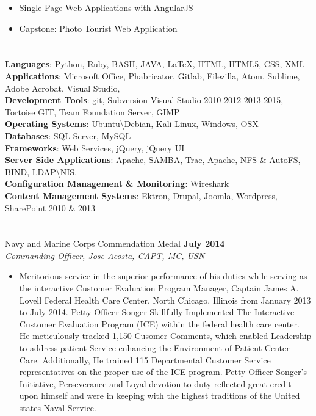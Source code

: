 \documentclass[a4papper,overlapped,line]{res}
\newcommand{\osection}[1]{\section{\sc {\color{MidnightBlue}\vspace{-0.60cm} \textbf{#1}\\}}}
\begin{document}
\begin{resume}
\begin{itemize}
	\item Single Page Web Applications with AngularJS
	\item Capstone: Photo Tourist Web Application
\end{itemize}
\osection{TECHNOLOGY}
\textbf{Languages}:  Python, Ruby, BASH, JAVA, \LaTeX, HTML, HTML5, CSS, XML \\
\textbf{Applications}: Microsoft Office, Phabricator, Gitlab, Filezilla, Atom, Sublime, Adobe Acrobat, Visual Studio,    \\
\textbf{Development Tools}: git, Subversion Visual Studio 2010 2012 2013 2015, Tortoise GIT, Team Foundation Server, GIMP  \\
\textbf{Operating Systems}:   Ubuntu\textbackslash Debian, Kali Linux, Windows, OSX\\
\textbf{Databases}: SQL Server, MySQL \\
\textbf{Frameworks}: Web Services, jQuery, jQuery UI   \\
\textbf{Server Side Applications}: Apache, SAMBA,  Trac, Apache, NFS \& AutoFS,  BIND, LDAP\textbackslash NIS.\\
\textbf{Configuration Management \& Monitoring}: Wireshark\\
\textbf{Content Management Systems}: Ektron, Drupal, Joomla, Wordpress, SharePoint  2010 \& 2013\\
\linebreak
\osection{HONORS AND AWARDS}
Navy and Marine Corps Commendation Medal \hfill \textbf{July 2014} \\
\textit{Commanding Officer, Jose Acosta, CAPT, MC, USN}
\begin{itemize}
	\item Meritorious service in the superior performance of his duties while serving as the interactive Customer Evaluation Program Manager, Captain James A. Lovell Federal Health Care Center, North Chicago, Illinois from January 2013 to July 2014. Petty Officer Songer Skillfully Implemented The Interactive Customer Evaluation Program (ICE) within the federal health care center. He meticulously tracked 1,150 Cusomer Comments, which enabled Leadership to address patient Service enhancing the Environment of Patient Center Care. Additionally, He trained 115 Departmental Customer Service representatives on the proper use of the ICE program. Petty Officer Songer's Initiative, Perseverance and Loyal devotion to duty reflected great credit upon himself and were in keeping with the highest traditions of the United states Naval Service.

\end{itemize}
\end{resume}
\end{document}
